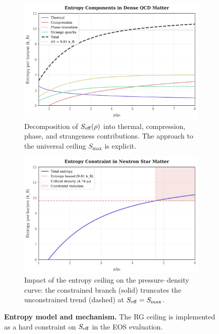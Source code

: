 \documentclass[11pt]{article}
\begin{document}
\begin{figure}[h!]
  \centering
  \begin{subfigure}[t]{0.48\textwidth}
    \includegraphics[width=\textwidth]{entropy_components.png}
    \caption{Decomposition of $S_{\rm eff}(\rho)$ into thermal, compression, phase, and strangeness contributions. The approach to the universal ceiling $S_{\max}$ is explicit.}
    \label{fig:entropy-components}
  \end{subfigure}\hfill
  \begin{subfigure}[t]{0.48\textwidth}
    \includegraphics[width=\textwidth]{entropy_constraint_effect.png}
    \caption{Impact of the entropy ceiling on the pressure--density curve: the constrained branch (solid) truncates the unconstrained trend (dashed) at $S_{\rm eff}=S_{\max}$.}
    \label{fig:entropy-constraint}
  \end{subfigure}
  \caption{\textbf{Entropy model and mechanism.} The RG ceiling is implemented as a hard constraint on $S_{\rm eff}$ in the EOS evaluation.}
  \label{fig:entropy-model}
\end{figure}
\end{document}

